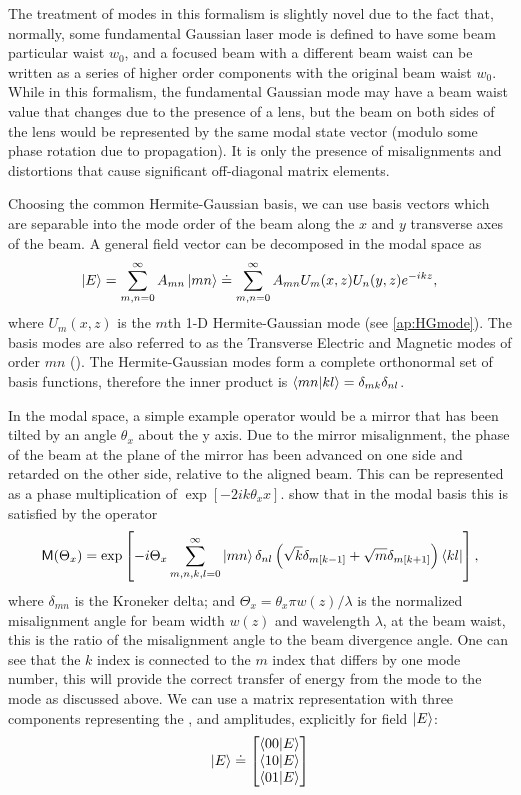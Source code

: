 The treatment of modes in this formalism is slightly novel due to the fact that, normally, some fundamental Gaussian laser mode is defined to have some beam particular waist $w_0$, and a focused beam with a different beam waist can be written as a series of higher order components with the original beam waist $w_0$. %
While in this formalism, the fundamental Gaussian mode may have a beam waist value that changes due to the presence of a lens, but the beam on both sides of the lens would be represented by the same modal state vector (modulo some phase rotation due to propagation). %
It is only the presence of misalignments and distortions that cause significant off-diagonal matrix elements.

Choosing the common Hermite-Gaussian basis, we can use basis vectors which are separable into the mode order of the beam along the $x$ and $y$ transverse axes of the beam. %
A general field vector can be decomposed in the modal space as
\begin{equation}
\left| E \right> = \sum_{m,n=0}^\infty A_{mn}\left| mn \right>\doteq\sum_{m,n=0}^\infty A_{mn}U_m(x,z)U_n(y,z)e^{-ikz},
\end{equation}
where $U_m(x,z)$ is the $m$th 1-D Hermite-Gaussian mode (see \ref{ap:HGmode}). %
The basis modes are also referred to as the Transverse Electric and Magnetic modes of order $mn$ (). %
The Hermite-Gaussian modes form a complete orthonormal set of basis functions, therefore the inner product is $\inprod{mn}{kl}=\delta_{mk}\delta_{nl}$.

In the modal space, a simple example operator would be a mirror that has been tilted by an angle $\theta_x$ about the y axis. %
Due to the mirror misalignment, the phase of the beam at the plane of the mirror has been advanced on one side and retarded on the other side, relative to the aligned beam. %
This can be represented as a phase multiplication of $\exp[-2ik\theta_x x]$. %
\citet{Hefetz:97} show that in the modal basis this is satisfied by the operator
\begin{equation}
\mathsf{M}(\Theta_x) = \exp\left[ -i\Theta_x\sum_{m,n,k,l=0}^\infty \left| mn \right> \delta_{nl} \left( \sqrt k \delta_{m[k-1]}+\sqrt m \delta_{m[k+1]} \right) \left< kl \right|\right],
\end{equation}
where $\delta_{mn}$ is the Kroneker delta; and $\Theta_x = \theta_x \pi w(z)/\lambda$ is the normalized misalignment angle for beam width $w(z)$ and wavelength $\lambda$, at the beam waist, this is the ratio of the misalignment angle to the beam divergence angle. %
One can see that the $k$ index is connected to the $m$ index that differs by one mode number, this will provide the correct transfer of energy from the  mode to the  mode as discussed above. %
We can use a matrix representation with three components representing the ,  and  amplitudes, explicitly for field $\left| E \right>$:
\begin{equation}
\vect{E} \doteq \ms \inprod{00}{E} \\ \inprod{10}{E} \\ \inprod{01}{E} \me
\end{equation}

